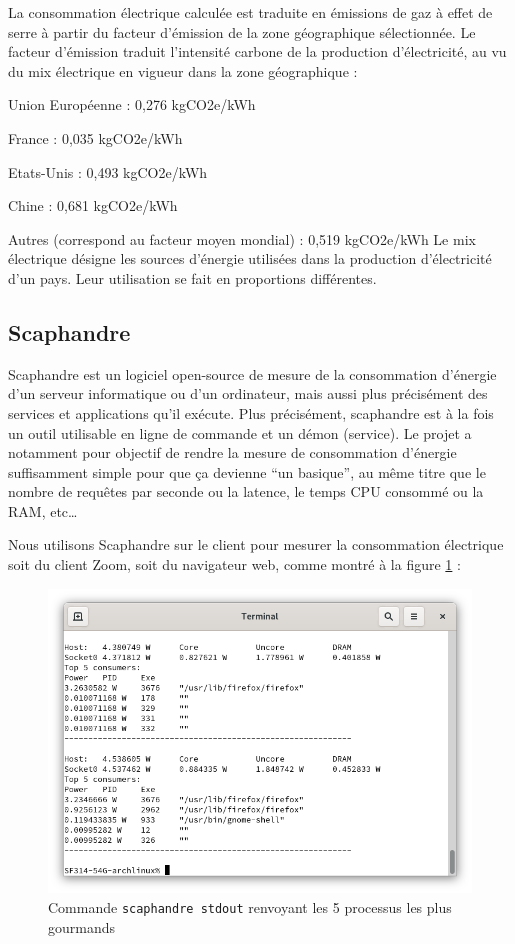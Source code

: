 \documentclass[11pt,a4paper]{report}
\begin{document}
La consommation électrique calculée est traduite en émissions de gaz à effet de serre à partir du facteur d’émission de la zone géographique sélectionnée. Le facteur d’émission traduit l’intensité carbone de la production d’électricité, au vu du mix électrique en vigueur dans la zone géographique :
\bi \item Union Européenne : 0,276 kgCO2e/kWh
\item France : 0,035 kgCO2e/kWh
\item Etats-Unis : 0,493 kgCO2e/kWh
\item Chine : 0,681 kgCO2e/kWh
\item Autres (correspond au facteur moyen mondial) : 0,519 kgCO2e/kWh \ei
{} Le mix électrique désigne les sources d’énergie utilisées dans la production d’électricité d’un pays. Leur utilisation se fait en proportions différentes. \eb

\subsection{Scaphandre}
Scaphandre est  un logiciel open-source de mesure de la consommation d'énergie d’un serveur informatique ou d'un ordinateur, mais aussi plus précisément des services et applications qu’il exécute. Plus précisément, scaphandre est à la fois un outil utilisable en ligne de commande et un démon (service).
Le projet a notamment pour objectif de rendre la mesure de consommation d'énergie suffisamment simple pour que ça devienne “un basique”, au même titre que le nombre de requêtes par seconde ou la latence, le temps CPU consommé ou la RAM, etc…

Nous utilisons Scaphandre sur le client pour mesurer la consommation électrique soit du client Zoom, soit du navigateur web, comme montré à la figure \ref{fig:scaph} :
\begin{figure}[!h]
    \centering
    \includegraphics[scale=0.5]{capture_scaphandre.png}
    \caption{Commande \texttt{scaphandre stdout} renvoyant les 5 processus les plus gourmands}
    \label{fig:scaph}
\end{figure}
\end{document}
